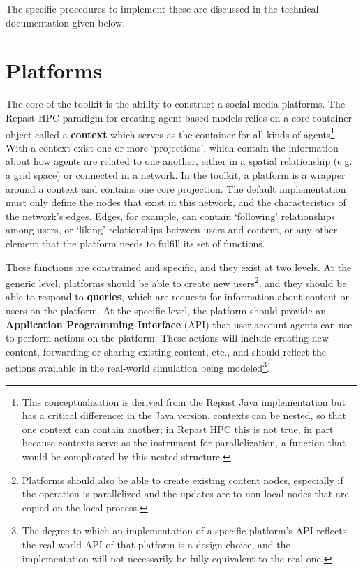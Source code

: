 The specific procedures to implement these are discussed in the technical documentation given below.

\section{Platforms}
The core of the \rhpc toolkit is the ability to construct a social media platforms. The Repast HPC paradigm for creating agent-based models relies on a core container object called a \textbf{context} which serves as the container for all kinds of agents\footnote{This conceptualization is derived from the Repast Java implementation but has a critical difference: in the Java version, contexts can be nested, so that one context can contain another; in Repast HPC this is not true, in part because contexts serve as the instrument for parallelization, a function that would be complicated by this nested structure.}. With a context exist one or more `projections', which contain the information about how agents are related to one another, either in a spatial relationship (e.g. a grid space) or connected in a network. In the \rhpc toolkit, a platform is a wrapper around a context and contains one core projection. The default implementation must only define the nodes that exist in this network, and the characteristics of the network's edges. Edges, for example, can contain `following' relationships among users, or `liking' relationships between users and content, or any other element that the platform needs to fulfill its set of functions.

These functions are constrained and specific, and they exist at two levels. At the generic level, platforms should be able to create new users\footnote{Platforms should also be able to create existing content nodes, especially if the operation is parallelized and the updates are to non-local nodes that are copied on the local process.}, and they should be able to respond to \textbf{queries}, which are requests for information about content or users on the platform. At the specific level, the platform should provide an \textbf{Application Programming Interface} (API) that user account agents can use to perform actions on the platform. These actions will include creating new content, forwarding or sharing existing content, etc., and should reflect the actions available in the real-world simulation being modeled\footnote{The degree to which an implementation of a specific platform's API reflects the real-world API of that platform is a design choice, and the implementation will not necessarily be fully equivalent to the real one.}.

